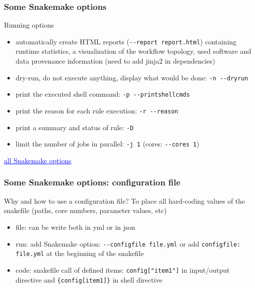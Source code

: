 \begin{frame}[containsverbatim]
\frametitle{Some Snakemake options}
\begin{block}{Running options}
\begin{itemize}
    \item automatically create HTML reports (\verb|--report report.html|) containing runtime statistics, a visualization of the workflow topology, used software and data provenance information (need to add jinja2 in dependencies)
    \item dry-run, do not execute anything, display what would be done: \verb|-n --dryrun|
    \item print the executed shell command: \verb|-p --printshellcmds |
    \item print the reason for each rule execution: \verb|-r --reason|
    \item print a summary and status of rule: \verb|-D|
    \item limit the number of jobs in parallel: \verb|-j 1| (cores: \verb|--cores 1|)
\end{itemize}
\end{block}
\vfill
\href{https://snakemake.readthedocs.io/en/stable/executing/cli.html#all-option}{\textcolor{blue}{\underline{all Snakemake options}}}
\end{frame}
\begin{frame}[containsverbatim]
\frametitle{Some Snakemake options: configuration file}
\begin{block}{Why and how to use a configuration file?}
To place all hard-coding values of the snakefile (paths, core numbers, parameter values, etc)
\begin{itemize}
    \item file: can be write both in yml or in json
    \item run: add Snakemake option: \verb|--configfile file.yml| or add \verb|configfile: file.yml| at the beginning of the snakefile
    \item code: snakefile call of defined items: \verb|config["item1"]| in input/output directive and \verb|{config[item1]}| in shell directive
\end{itemize}
\end{block}
\end{frame}
